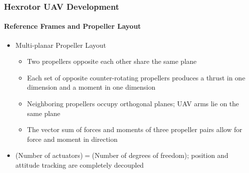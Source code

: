 \documentclass[11pt,professionalfonts,hyperref={pdftex,pdfpagemode=none,pdfstartview=FitH}]{beamer}
\renewcommand{\emph}[1]{\textit{\textbf{\color{blue}{#1}}}}
\begin{document}
\begin{frame}
\frametitle{Hexrotor UAV Development}
\framesubtitle{Reference Frames and Propeller Layout}

\begin{itemize}
	\item Multi-planar Propeller Layout
	\begin{itemize}
	\item Two propellers opposite each other share the same plane
	\item Each set of opposite counter-rotating propellers produces a thrust in one dimension and a moment in one dimension
	\item Neighboring propellers occupy orthogonal planes; UAV arms lie on the same plane
	\item The vector sum of forces and moments of three propeller pairs allow for force and moment in \emph{any} direction
	\end{itemize}
\item (Number of actuators)$=$(Number of degrees of freedom); position and attitude tracking are completely decoupled

\end{itemize}
\end{frame}
\end{document}

